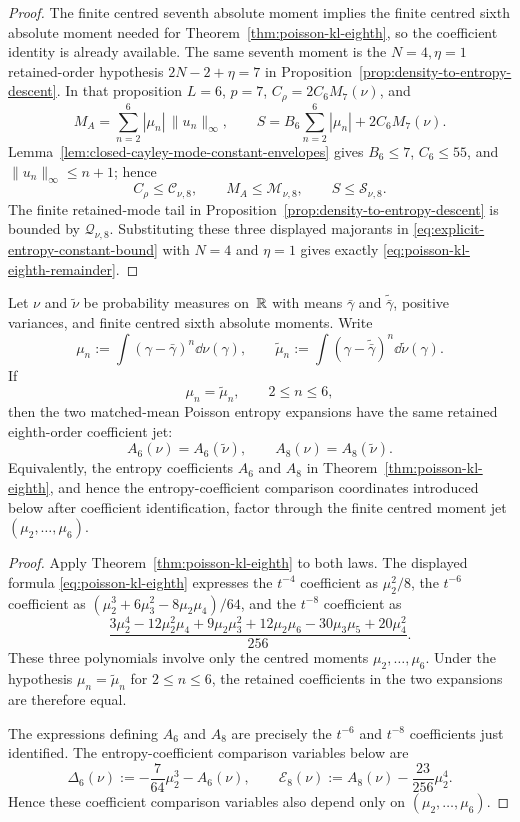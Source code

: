 \begin{proof}
The finite centred seventh absolute moment implies the finite centred sixth
absolute moment needed for Theorem~\ref{thm:poisson-kl-eighth}, so the
coefficient identity is already available.  The same seventh moment is the
\(N=4,\eta=1\) retained-order hypothesis \(2N-2+\eta=7\) in
Proposition~\ref{prop:density-to-entropy-descent}.  In that proposition
\(L=6\), \(p=7\), \(C_\rho=2C_6M_7(\nu)\), and
\[
M_A=\sum_{n=2}^{6}|\mu_n|\,\|u_n\|_\infty,\qquad
S=B_6\sum_{n=2}^{6}|\mu_n|+2C_6M_7(\nu).
\]
Lemma~\ref{lem:closed-cayley-mode-constant-envelopes} gives
\(B_6\le7\), \(C_6\le55\), and \(\|u_n\|_\infty\le n+1\); hence
\[
C_\rho\le\mathcal C_{\nu,8},\qquad
M_A\le\mathcal M_{\nu,8},\qquad
S\le\mathcal S_{\nu,8}.
\]
The finite retained-mode tail in Proposition~\ref{prop:density-to-entropy-descent}
is bounded by \(\mathcal Q_{\nu,8}\).  Substituting these three displayed
majorants in \eqref{eq:explicit-entropy-constant-bound} with \(N=4\) and
\(\eta=1\) gives exactly
\eqref{eq:poisson-kl-eighth-remainder}.
\end{proof}

\begin{corollary}%
\label{cor:eighth-order-jet-factorization}
Let $\nu$ and $\widetilde\nu$ be probability measures on~$\mathbb{R}$ with means
$\bar{\gamma}$ and $\widetilde{\bar{\gamma}}$, positive variances, and finite
centred sixth absolute moments.  Write
\[
\mu_n:=\int(\gamma-\bar{\gamma})^n\dd\nu(\gamma),
\qquad
\widetilde\mu_n:=\int(\gamma-\widetilde{\bar{\gamma}})^n
\dd\widetilde\nu(\gamma).
\]
If
\[
\mu_n=\widetilde\mu_n,
\qquad 2\le n\le6,
\]
then the two matched-mean Poisson entropy expansions have the same retained
eighth-order coefficient jet:
\[
A_6(\nu)=A_6(\widetilde\nu),
\qquad
A_8(\nu)=A_8(\widetilde\nu).
\]
Equivalently, the entropy coefficients \(A_6\) and
\(A_8\) in Theorem~\ref{thm:poisson-kl-eighth}, and hence the
entropy-coefficient comparison coordinates introduced below after coefficient identification,
factor through the finite centred moment jet $(\mu_2,\ldots,\mu_6)$.
\end{corollary}

\begin{proof}
Apply Theorem~\ref{thm:poisson-kl-eighth} to both laws.  The displayed
formula \eqref{eq:poisson-kl-eighth} expresses the $t^{-4}$ coefficient as
\(\mu_2^2/8\), the $t^{-6}$ coefficient as
\((\mu_2^3+6\mu_3^2-8\mu_2\mu_4)/64\), and the $t^{-8}$ coefficient as
\[
\frac{3\mu_2^4-12\mu_2^2\mu_4+9\mu_2\mu_3^2
+12\mu_2\mu_6-30\mu_3\mu_5+20\mu_4^2}{256}.
\]
These three polynomials involve only the centred moments
\(\mu_2,\ldots,\mu_6\).  Under the hypothesis
\(\mu_n=\widetilde\mu_n\) for $2\le n\le6$, the retained coefficients in the
two expansions are therefore equal.

The expressions defining \(A_6\) and
\(A_8\) are precisely the \(t^{-6}\) and \(t^{-8}\)
coefficients just identified.  The entropy-coefficient comparison variables below are
\[
\Delta_6(\nu)
:=-\frac{7}{64}\mu_2^3-A_6(\nu),
\qquad
\mathcal E_8(\nu)
:=A_8(\nu)-\frac{23}{256}\mu_2^4 .
\]
Hence these coefficient comparison variables also depend only on $(\mu_2,\ldots,\mu_6)$.
\end{proof}

